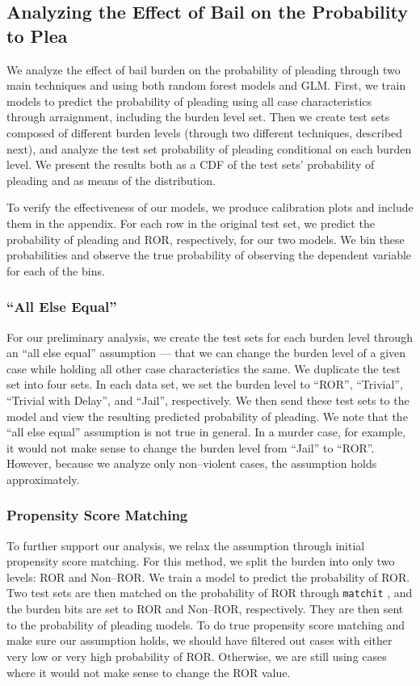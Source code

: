 \subsection{Analyzing the Effect of Bail on the Probability to Plea}
We analyze the effect of bail burden on the probability of pleading through
two main techniques and
using both random forest models and GLM.
First,
we train models to predict the probability of pleading using all case characteristics through arraignment,
including the burden level set.
Then we create test sets composed of different burden levels
(through two different techniques,
described next),
and analyze the test set probability of pleading conditional on each burden level.
We present the results both as a CDF of the test sets' probability of pleading and as means of the distribution.

To verify the effectiveness of our models,
we produce calibration plots and include them in the appendix.
For each row in the original test set,
we predict the probability of pleading and ROR,
respectively,
for our two models.
We bin these probabilities and observe the true probability of observing the dependent variable for each of the bins.


\subsubsection{``All Else Equal''}
For our preliminary analysis,
we create the test sets for each burden level through an ``all else equal'' assumption
--- that we can change the burden level of a given case while holding all other case characteristics the same.
We duplicate the test set into four sets.
In each data set,
we set the burden level to
  ``ROR'',
  ``Trivial'',
  ``Trivial with Delay'',
  and
  ``Jail'',
respectively.
We then send these test sets to the model and view the resulting predicted probability of pleading.
We note that the ``all else equal'' assumption is not true in general.
In a murder case,
for example,
it would not make sense to change the burden level from ``Jail'' to ``ROR''.
However,
because we analyze only non--violent cases,
the assumption holds approximately.



\subsubsection{Propensity Score Matching}
To further support our analysis,
we relax the assumption through initial propensity score matching.
For this method,
we split the burden into only two levels: ROR and Non--ROR.
We train a model to predict the probability of ROR.
Two test sets are then matched on the probability of ROR through \texttt{matchit}
\citep{matchit},
and the burden bits are set to ROR and Non--ROR,
respectively.
They are then sent to the probability of pleading models.
To do true propensity score matching and make sure our assumption holds,
we should have filtered out cases with either very low or very high probability of ROR.
Otherwise,
we are still using cases where it would not make sense to change the ROR value.


